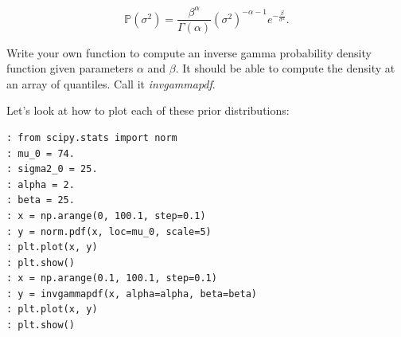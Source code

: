 $$\mathbb{P}(\sigma^{2}) = \frac{\beta^{\alpha}}{\Gamma(\alpha)}(\sigma^{2})^{-\alpha - 1}e^{-\frac{\beta}{\sigma^{2}}}.$$

\begin{problem}
Write your own function to compute an inverse gamma probability density function given parameters $\alpha$ and $\beta$. It should be able to compute the density at an array of quantiles. Call it \emph{invgammapdf}.
\end{problem}

Let's look at how to plot each of these prior distributions:

\begin{lstlisting}
: from scipy.stats import norm
: mu_0 = 74.
: sigma2_0 = 25.
: alpha = 2.
: beta = 25.
: x = np.arange(0, 100.1, step=0.1)
: y = norm.pdf(x, loc=mu_0, scale=5)
: plt.plot(x, y)
: plt.show()
: x = np.arange(0.1, 100.1, step=0.1)
: y = invgammapdf(x, alpha=alpha, beta=beta)
: plt.plot(x, y)
: plt.show()
\end{lstlisting}

